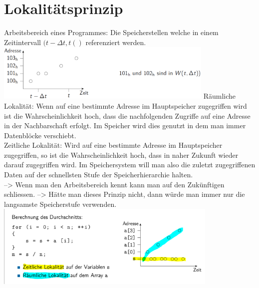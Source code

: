 \section{Lokalitätsprinzip}
\textcolor{myblue}{Arbeitsbereich eines Programmes}: Die Speicherstellen welche in einem Zeitintervall $(t - \Delta t,t()$ referenziert werden.\\
\includegraphics[width=\columnwidth]{img/lokalitaetsprinzip.png}
\textcolor{myblue}{Räumliche Lokalität}: Wenn auf eine bestimmte Adresse im Hauptspeicher zugegriffen wird ist die Wahrscheinlichkeit hoch, dass die nachfolgenden Zugriffe auf eine Adresse in der Nachbarschaft erfolgt. Im Speicher wird dies genutzt in dem man immer Datenblöcke verschiebt.\\
\textcolor{myblue}{Zeitliche Lokalität}: Wird auf eine bestimmte Adresse im Hauptspeicher zugegriffen, so ist die Wahrscheinlichkeit hoch, dass in naher Zukunft wieder darauf zugegriffen wird. Im Speichersystem will man also die zuletzt zugegriffenen Daten auf der schnellsten Stufe der Speicherhierarchie halten. \\
--> Wenn man den Arbeitsbereich kennt kann man auf den Zukünftigen schliessen.
--> Hätte man dieses Prinzip nicht, dann würde man immer nur die langsamste Speicherstufe verwenden.\\
\includegraphics[width=\columnwidth]{img/lokalitaetsprinzip_beispiel.png}
